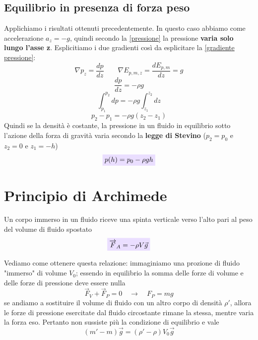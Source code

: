 \documentclass[x11names]{report}
\newcommand{\viola}[1]{\colorbox{yred}{$\displaystyle #1$}}
\begin{document}
	\subsection{Equilibrio in presenza di forza peso}
	Applichiamo i risultati ottenuti precedentemente. In questo caso abbiamo come accelerazione \(a_z = -g\), quindi secondo la \ref{pressione} la pressione \textbf{varia solo lungo l'asse z}. Esplicitiamo i due gradienti così da esplicitare la \ref{gradiente pressione}:
	\[ 
	\boxed{\nabla p_z = \frac{d p}{d z} }\qquad \boxed{\nabla E_{p,m,z} = \frac{d E_{p,m}}{d z} = g}
	\]
	\[ 
	\frac{dp}{dz} = -\rho g
	\]
	\[ 
	\int_{p_1}^{p_2}dp = -\rho g \int_{z_1}^{z_2}dz
	\]
	\[ 
	p_2 - p_1 = -\rho g (z_2 - z_1)
	\]
	Quindi se la densità è costante, la pressione in un fluido in equilibrio sotto l'azione della forza di gravità varia secondo la \textbf{legge di Stevino }(\(p_2 = p_0\) e \(z_2 = 0\) e \(z_1 = -h\))
	\begin{equation}\label{stevino}
		\viola{ p(h) = p_0 -\rho g h}
	\end{equation}
	
	\section{Principio di Archimede}
	Un corpo immerso in un fluido riceve una spinta verticale verso l'alto  pari al peso del volume di fluido spostato
	\begin{equation}
	\viola{	\overrightarrow{F}_A = -\rho V \vec{g}}
	\end{equation}
	

	
	Vediamo come ottenere questa relazione: immaginiamo una prozione di fluido "immerso" di volume \(V_{0}\); essendo in equilibrio la somma delle forze di volume e delle forze di pressione deve essere nulla
	\[ 
	\overrightarrow{F}_{V} + \overrightarrow{F}_{P} = 0 \quad \to \quad F_{P} = mg
	\]
	se andiamo a sostituire il volume di fluido con un altro corpo di densità \(\rho'\), allora le forze di pressione esercitate dal fluido circostante rimane la stessa, mentre varia la forza eso. Pertanto non sussiste più la condizione di equilibrio e vale
	\[ 
	(m' - m)\vec{g} = (\rho'-\rho)V_{0}\vec{g}
	\]
	
\end{document}
